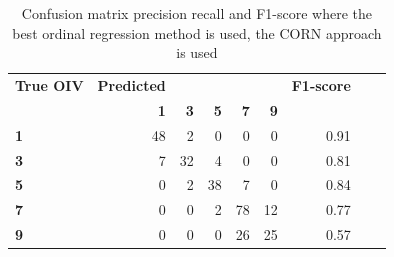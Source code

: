 \documentclass[english]{article}
\begin{document}
\begin{table}[H]
    \centering
    \caption{Confusion matrix precision recall and F1-score where the best ordinal regression method is used, the CORN approach is used}
    \label{tab:dtafracevol}
    \begin{tabular}{lrrrrrrrr}
        \toprule
        \textbf{True OIV} & \textbf{Predicted} &            &            &            &            & \textbf{F1-score}   \\
        {}                & \textbf{1}         & \textbf{3} & \textbf{5} & \textbf{7} & \textbf{9} &                   & \\
        \midrule
        \textbf{1}        & 48                 & 2          & 0          & 0          & 0          & 0.91                \\
        \textbf{3}        & 7                  & 32         & 4          & 0          & 0          & 0.81                \\
        \textbf{5}        & 0                  & 2          & 38         & 7          & 0          & 0.84                \\
        \textbf{7}        & 0                  & 0          & 2          & 78         & 12         & 0.77                \\
        \textbf{9}        & 0                  & 0          & 0          & 26         & 25         & 0.57                \\
        \bottomrule
    \end{tabular}
\end{table}

\end{document}
